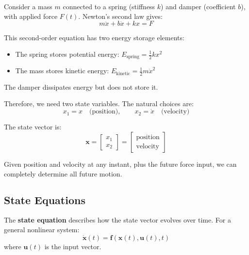 \begin{example}
\label{ex:msd_state_variables}
Consider a mass $m$ connected to a spring (stiffness $k$) and damper (coefficient $b$), with applied force $F(t)$. Newton's second law gives:
\begin{equation}
m\ddot{x} + b\dot{x} + kx = F
\end{equation}

This second-order equation has two energy storage elements:
\begin{itemize}
    \item The spring stores potential energy: $E_{\text{spring}} = \frac{1}{2}kx^2$
    \item The mass stores kinetic energy: $E_{\text{kinetic}} = \frac{1}{2}m\dot{x}^2$
\end{itemize}
The damper dissipates energy but does not store it.

Therefore, we need two state variables. The natural choices are:
\begin{equation}
x_1 = x \quad \text{(position)}, \qquad x_2 = \dot{x} \quad \text{(velocity)}
\end{equation}

The state vector is:
\begin{equation}
\mathbf{x} = \begin{bmatrix} x_1 \\ x_2 \end{bmatrix} = \begin{bmatrix} \text{position} \\ \text{velocity} \end{bmatrix}
\end{equation}

Given position and velocity at any instant, plus the future force input, we can completely determine all future motion.
\end{example}

\subsection{State Equations}

The \textbf{state equation} describes how the state vector evolves over time. For a general nonlinear system:
\begin{equation}
\dot{\mathbf{x}}(t) = \mathbf{f}(\mathbf{x}(t), \mathbf{u}(t), t)
\end{equation}
where $\mathbf{u}(t)$ is the input vector.

